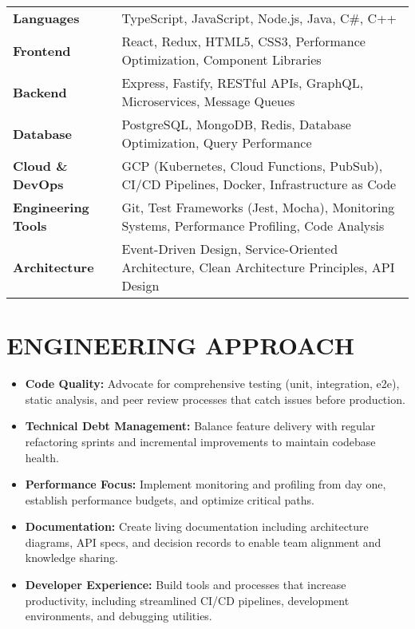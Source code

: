 \documentclass{fullstackdeveloper-ats}
\begin{document}
\begin{tabular}{p{3.5cm}p{13cm}}
\textbf{Languages} & TypeScript, JavaScript, Node.js, Java, C\#, C++ \\[0.2cm]

\textbf{Frontend} & React, Redux, HTML5, CSS3, Performance Optimization, Component Libraries \\[0.2cm]

\textbf{Backend} & Express, Fastify, RESTful APIs, GraphQL, Microservices, Message Queues \\[0.2cm]

\textbf{Database} & PostgreSQL, MongoDB, Redis, Database Optimization, Query Performance \\[0.2cm]

\textbf{Cloud \& DevOps} & GCP (Kubernetes, Cloud Functions, PubSub), CI/CD Pipelines, Docker, Infrastructure as Code \\[0.2cm]

\textbf{Engineering Tools} & Git, Test Frameworks (Jest, Mocha), Monitoring Systems, Performance Profiling, Code Analysis \\[0.2cm]

\textbf{Architecture} & Event-Driven Design, Service-Oriented Architecture, Clean Architecture Principles, API Design \\
\end{tabular}

\section{ENGINEERING APPROACH}

\begin{itemize}
    \item \textbf{Code Quality:} Advocate for comprehensive testing (unit, integration, e2e), static analysis, and peer review processes that catch issues before production.
    
    \item \textbf{Technical Debt Management:} Balance feature delivery with regular refactoring sprints and incremental improvements to maintain codebase health.
    
    \item \textbf{Performance Focus:} Implement monitoring and profiling from day one, establish performance budgets, and optimize critical paths.
    
    \item \textbf{Documentation:} Create living documentation including architecture diagrams, API specs, and decision records to enable team alignment and knowledge sharing.
    
    \item \textbf{Developer Experience:} Build tools and processes that increase productivity, including streamlined CI/CD pipelines, development environments, and debugging utilities.
\end{itemize}
\end{document}
